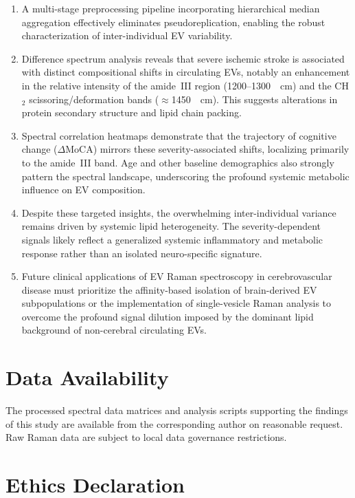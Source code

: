 \documentclass[preprint,12pt]{elsarticle}
\begin{document}
\begin{enumerate}
  \item A multi-stage preprocessing pipeline incorporating hierarchical median aggregation effectively eliminates pseudoreplication, enabling the robust characterization of inter-individual EV variability.
  \item Difference spectrum analysis reveals that severe ischemic stroke is associated with distinct compositional shifts in circulating EVs, notably an enhancement in the relative intensity of the amide~III region (1200--1300~\si{\per\centi\metre}) and the CH$_2$ scissoring/deformation bands ($\approx$1450~\si{\per\centi\metre}). This suggests alterations in protein secondary structure and lipid chain packing.
  \item Spectral correlation heatmaps demonstrate that the trajectory of cognitive change ($\Delta$MoCA) mirrors these severity-associated shifts, localizing primarily to the amide~III band. Age and other baseline demographics also strongly pattern the spectral landscape, underscoring the profound systemic metabolic influence on EV composition.
  \item Despite these targeted insights, the overwhelming inter-individual variance remains driven by systemic lipid heterogeneity. The severity-dependent signals likely reflect a generalized systemic inflammatory and metabolic response rather than an isolated neuro-specific signature.
  \item Future clinical applications of EV Raman spectroscopy in cerebrovascular disease must prioritize the affinity-based isolation of brain-derived EV subpopulations or the implementation of single-vesicle Raman analysis to overcome the profound signal dilution imposed by the dominant lipid background of non-cerebral circulating EVs.
\end{enumerate}

\section*{Data Availability}

The processed spectral data matrices and analysis scripts supporting the findings of this study are available from the corresponding author on reasonable request. Raw Raman data are subject to local data governance restrictions.

\section*{Ethics Declaration}
\end{document}
